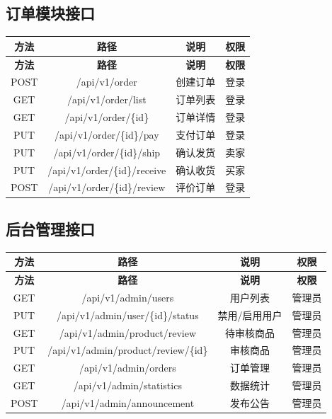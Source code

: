 \documentclass[12pt,a4paper,UTF8]{ctexart}
\begin{document}
\subsection{订单模块接口}

\begin{longtable}{|c|c|c|c|}
    \hline
    \textbf{方法} & \textbf{路径} & \textbf{说明} & \textbf{权限} \\
    \hline
    \endfirsthead
    \hline
    \textbf{方法} & \textbf{路径} & \textbf{说明} & \textbf{权限} \\
    \hline
    \endhead
    \hline
    \endfoot

    POST & /api/v1/order & 创建订单 & 登录 \\
    \hline
    GET & /api/v1/order/list & 订单列表 & 登录 \\
    \hline
    GET & /api/v1/order/\{id\} & 订单详情 & 登录 \\
    \hline
    PUT & /api/v1/order/\{id\}/pay & 支付订单 & 登录 \\
    \hline
    PUT & /api/v1/order/\{id\}/ship & 确认发货 & 卖家 \\
    \hline
    PUT & /api/v1/order/\{id\}/receive & 确认收货 & 买家 \\
    \hline
    POST & /api/v1/order/\{id\}/review & 评价订单 & 登录 \\
    \hline
\end{longtable}

\subsection{后台管理接口}

\begin{longtable}{|c|c|c|c|}
    \hline
    \textbf{方法} & \textbf{路径} & \textbf{说明} & \textbf{权限} \\
    \hline
    \endfirsthead
    \hline
    \textbf{方法} & \textbf{路径} & \textbf{说明} & \textbf{权限} \\
    \hline
    \endhead
    \hline
    \endfoot

    GET & /api/v1/admin/users & 用户列表 & 管理员 \\
    \hline
    PUT & /api/v1/admin/user/\{id\}/status & 禁用/启用用户 & 管理员 \\
    \hline
    GET & /api/v1/admin/product/review & 待审核商品 & 管理员 \\
    \hline
    PUT & /api/v1/admin/product/review/\{id\} & 审核商品 & 管理员 \\
    \hline
    GET & /api/v1/admin/orders & 订单管理 & 管理员 \\
    \hline
    GET & /api/v1/admin/statistics & 数据统计 & 管理员 \\
    \hline
    POST & /api/v1/admin/announcement & 发布公告 & 管理员 \\
    \hline
\end{longtable}
\end{document}

